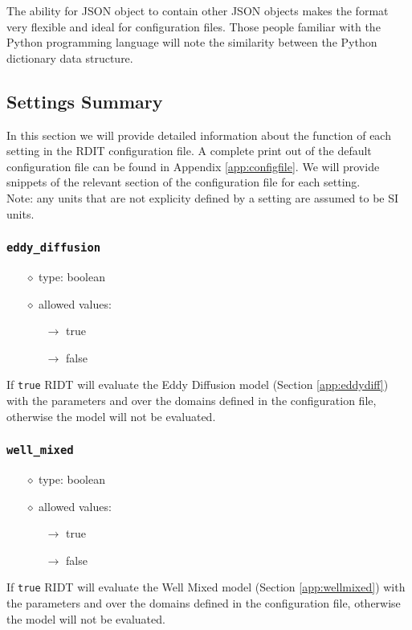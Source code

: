 \documentclass[]{article}
\def\code#1{\texttt{#1}}
\begin{document}
\noindent The ability for JSON object to contain other JSON objects makes the
format very flexible and ideal for configuration files. Those people familiar
with the Python programming language will note the similarity between the Python
dictionary data structure.

\subsection{Settings Summary}
In this section we will provide detailed information about the function of each
setting in the RDIT configuration file. A complete print out of the default
configuration file can be found in Appendix \ref{app:configfile}. We will
provide snippets of the relevant section of the configuration file for each
setting.\\

\noindent Note: any units that are not explicity defined by a setting are
assumed to be SI units.

\subsubsection{\code{eddy\_diffusion}}
\begin{itemize}
    \item[$\diamond$] type: boolean
    \item[$\diamond$] allowed values:
    \begin{itemize}
        \item[$\rightarrow$] true
        \item[$\rightarrow$] false
    \end{itemize}
\end{itemize}
If \code{true} RIDT will evaluate the Eddy Diffusion model (Section
\ref{app:eddydiff}) with the parameters and over the domains defined in
the configuration file, otherwise the model will not be evaluated.

\subsubsection{\code{well\_mixed}}
\begin{itemize}
    \item[$\diamond$] type: boolean
    \item[$\diamond$] allowed values:
    \begin{itemize}
        \item[$\rightarrow$] true
        \item[$\rightarrow$] false
    \end{itemize}
\end{itemize}
If \code{true} RIDT will evaluate the Well Mixed model (Section
\ref{app:wellmixed}) with the parameters and over the domains defined in the
configuration file, otherwise the model will not be evaluated.
\end{document}
